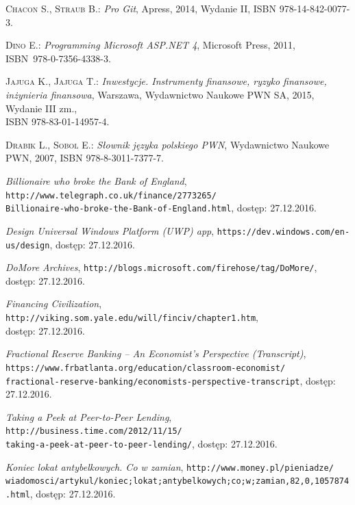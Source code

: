 \documentclass[a4paper,twoside,titlepage,openright]{book}
\begin{document}
\begin{thebibliography}{99}

 \textsc{Chacon S., Straub B.:}
\textit{Pro Git}, Apress, 2014, Wydanie II, ISBN 978-14-842-0077-3.

 \textsc{Dino E.:}
\textit{Programming Microsoft ASP.NET 4}, Microsoft Press, 2011, \\ISBN~978-0-7356-4338-3.

 \textsc{Jajuga K., Jajuga T.:}
\textit{Inwestycje. Instrumenty finansowe, ryzyko finansowe, inżynieria finansowa}, Warszawa, Wydawnictwo Naukowe PWN SA, 2015, Wydanie III zm., \\ISBN 978-83-01-14957-4.

 \textsc{Drabik L., Sobol	E.:}
\textit{Słownik języka polskiego PWN}, Wydawnictwo Naukowe PWN, 2007, ISBN 978-8-3011-7377-7.

 \textit{Billionaire who broke the Bank of England}, 
\texttt{http://www.telegraph.co.uk/finance/2773265/\\Billionaire-who-broke-the-Bank-of-England.html}, dostęp: 27.12.2016.

 \textit{Design Universal Windows Platform (UWP) app}, 
\texttt{https://dev.windows.com/en-us/design}, dostęp: 27.12.2016.

 \textit{DoMore Archives}, 
\texttt{http://blogs.microsoft.com/firehose/tag/DoMore/}, \\dostęp: 27.12.2016.

 \textit{Financing Civilization}, 
\texttt{http://viking.som.yale.edu/will/finciv/chapter1.htm}, \\dostęp: 27.12.2016.

 \textit{Fractional Reserve Banking -- An Economist's Perspective (Transcript)}, \\
\texttt{https://www.frbatlanta.org/education/classroom-economist/\\fractional-reserve-banking/economists-perspective-transcript}, dostęp: 27.12.2016.

 \textit{Taking a Peek at Peer-to-Peer Lending}, 
\texttt{http://business.time.com/2012/11/15/\\taking-a-peek-at-peer-to-peer-lending/}, dostęp: 27.12.2016.

 \textit{Koniec lokat antybelkowych. Co w zamian}, 
\texttt{http://www.money.pl/pieniadze/\\wiadomosci/artykul/koniec;lokat;antybelkowych;co;w;zamian,82,0,1057874.html}, dostęp: 27.12.2016.


\end{thebibliography}
\end{document}
